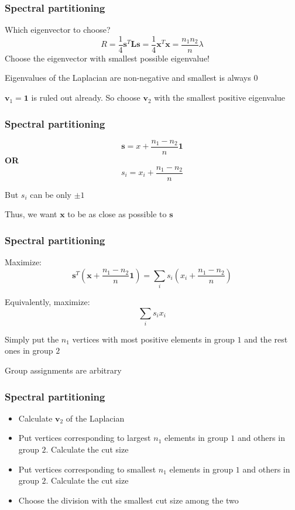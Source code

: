 \documentclass{beamer}
\begin{document}
\begin{frame}
    \frametitle{Spectral partitioning}
    \centering
    Which eigenvector to choose?
    $$R = \frac{1}{4}{\mathbf s}^T{\mathbf L}{\mathbf s} = \frac{1}{4}{\mathbf x}^T{\mathbf x} = \frac{n_1n_2}{n}\lambda$$
    Choose the eigenvector with smallest possible eigenvalue!

    \vspace{1em}
    Eigenvalues of the Laplacian are non-negative and smallest is always $0$

    \vspace{1em}
    ${\mathbf v}_1 = {\mathbf 1}$ is ruled out already. So choose ${\mathbf v}_2$ with the smallest positive eigenvalue
\end{frame}
\begin{frame}
    \frametitle{Spectral partitioning}
    \centering
    $${\mathbf s} = x + \frac{n_1-n_2}{n}{\mathbf 1}$$
    {\bf OR}
    $$s_i = x_i + \frac{n_1-n_2}{n}$$

    \vspace{2em}
    But $s_i$ can be only $\pm 1$

    \vspace{2em}
    Thus, we want ${\mathbf x}$ to be as close as possible to ${\mathbf s}$
\end{frame}
\begin{frame}
    \frametitle{Spectral partitioning}
    Maximize:
    \centering
    $${\mathbf s}^T\left({\mathbf x + \frac{n_1-n_2}{n}{\mathbf 1}}\right) = \sum\limits_is_i\left(x_i + \frac{n_1-n_2}{n}\right)$$

    Equivalently, maximize:
    $$\sum\limits_is_ix_i$$

    Simply put the $n_1$ vertices with most positive elements in group $1$ and the rest ones in group $2$

    \vspace{1em}
    Group assignments are arbitrary
\end{frame}
\begin{frame}
    \frametitle{Spectral partitioning}
    \centering

    \begin{itemize}
        \setlength\itemsep{1em}
        \item{Calculate ${\mathbf v}_2$ of the Laplacian}
        \item{Put vertices corresponding to largest $n_1$ elements in group $1$ and others in group $2$. Calculate the cut size}
        \item{Put vertices corresponding to smallest $n_1$ elements in group $1$ and others in group $2$. Calculate the cut size}
        \item{Choose the division with the smallest cut size among the two}
    \end{itemize}
\end{frame}
\end{document}
